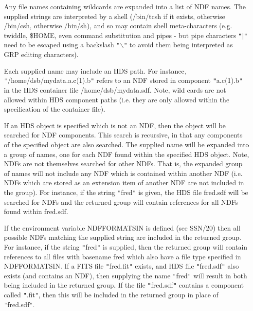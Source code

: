 \documentclass[twoside,11pt]{article}
\renewcommand{\_}{\texttt{\symbol{95}}}
\newcommand{\sstitem}{\item}
\newcommand{\sstitem}{\item}
\begin{document}
{{{         \sstitem
         Any file names containing wildcards are expanded into a list of NDF
         names. The supplied strings are interpreted by a shell (/bin/tcsh if
         it exists, otherwise /bin/csh, otherwise /bin/sh), and so may
         contain shell meta-characters (e.g. twiddle, \$HOME, even command
         substitution and pipes - but pipe characters {\tt "}$|${\tt "} need to be escaped
         using a backslash {\tt "}$\backslash${\tt "} to avoid them being interpreted as GRP
         editing characters).

         \sstitem
         Each supplied name may include an HDS path. For instance,
         {\tt "}/home/dsb/mydata.a.c(1).b{\tt "} refers to an NDF stored in component
         {\tt "}a.c(1).b{\tt "} in the HDS container file /home/dsb/mydata.sdf. Note,
         wild cards are not allowed within HDS component paths (i.e. they
         are only allowed within the specification of the container file).

         \sstitem
         If an HDS object is specified which is not an NDF, then the
         object will be searched for NDF components. This search is
         recursive, in that any components of the specified object are also
         searched. The supplied name will be expanded into a group of names,
         one for each NDF found within the specified HDS object. Note, NDFs
         are not themselves searched for other NDFs. That is, the expanded
         group of names will not include any NDF which is contained within
         another NDF (i.e. NDFs which are stored as an extension item of
         another NDF are not included in the group). For instance, if the
         string {\tt "}fred{\tt "} is given, the HDS file fred.sdf will be searched for
         NDFs and the returned group will contain references for all NDFs
         found within fred.sdf.

         \sstitem
         If the environment variable NDF\_FORMATS\_IN is defined (see
         SSN/20) then all possible NDFs matching the supplied string are
         included in the returned group. For instance, if the string {\tt "}fred{\tt "}
         is supplied, then the returned group will contain references to all
         files with basename fred which also have a file type specified in
         NDF\_FORMATS\_IN. If a FITS file {\tt "}fred.fit{\tt "} exists, and HDS file
         {\tt "}fred.sdf{\tt "} also exists (and contains an NDF), then supplying the
         name {\tt "}fred{\tt "} will result in both being included in the returned
         group. If the file {\tt "}fred.sdf{\tt "} contains a component called {\tt "}.fit{\tt "},
         then this will be included in the returned group in place of
         {\tt "}fred.sdf{\tt "}.

}}}
\end{document}
